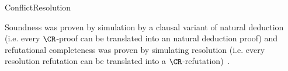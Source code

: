 \begin{entry}{ConflictResolution}
\begin{technicalities}
Soundness was proven by simulation by a clausal variant of natural deduction  (i.e. every $\CR$-proof can be translated into an natural deduction proof) and refutational completeness was proven by simulating resolution  (i.e. every resolution refutation can be translated into a $\CR$-refutation)~\cite{ConflictResolution}.
\end{technicalities}


\end{entry}
